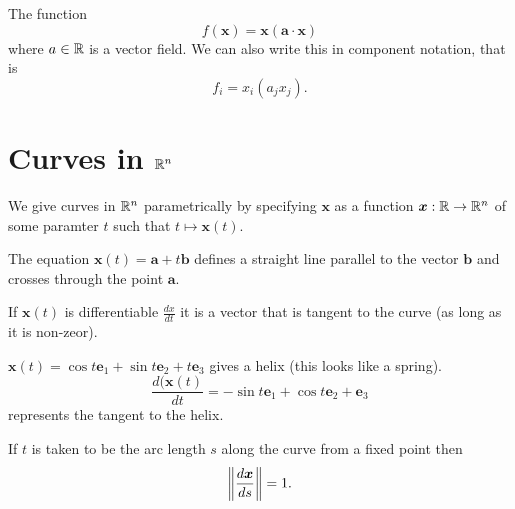 \begin{example}
    The function \[ f(\bm x) = \bm x (\bm a \cdot \bm x) \] where $a \in \mathbb{R}$ is a vector field. We can also write this in component notation, that is \[ f_i = x_i(a_jx_j). \]
\end{example}

\section{Curves in $\R^n$}

\begin{definition}[Curves in $\R^n$]
    We give curves in $\R^n$ parametrically by specifying $\bm x$ as a function $\bm x: \mathbb{R} \to \mathbb{R}^n$ of some paramter $t$ such that $t \mapsto \bm x(t)$. 
\end{definition}

\begin{example}
    The equation $\bm x(t) = \bm a + t \bm b$ defines a straight line parallel to the vector $\bm b$ and crosses through the point $\bm a$.
\end{example}

\begin{definition}
    If $\bm x(t)$ is differentiable $\frac{dx}{dt}$ it is a vector that is tangent to the curve (as long as it is non-zeor).
\end{definition}

\begin{example}
    $\bm x(t) = \cos{t} \bm e_1 + \sin{t} \bm e_2 + t \bm e_3$ gives a helix (this looks like a spring). \[ \frac{d(\bm x(t)}{dt} = -\sin{t} \bm e_1 + \cos{t} \bm e_2 + \bm e_3 \] represents the tangent to the helix.
\end{example}

\begin{remark}
    If $t$ is taken to be the arc length $s$ along the curve from a fixed point then \[ \left\lVert\frac{d \bm x}{ds}\right\rVert = 1. \] %
\end{remark}

